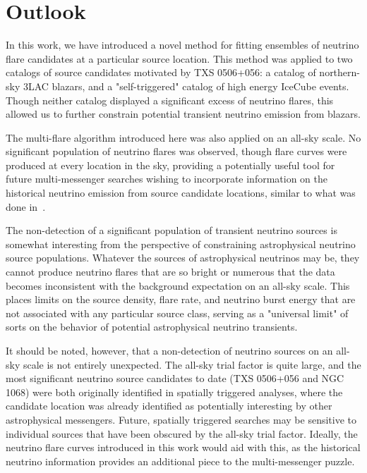 \chapter{Outlook}\label{chapter:outlook}

In this work, we have introduced a novel method for fitting ensembles of neutrino flare candidates at a particular source location. This method was applied to two catalogs of source candidates motivated by TXS 0506+056: a catalog of northern-sky 3LAC blazars, and a "self-triggered" catalog of high energy IceCube events. Though neither catalog displayed a significant excess of neutrino flares, this allowed us to further constrain potential transient neutrino emission from blazars. 

The multi-flare algorithm introduced here was also applied on an all-sky scale. No significant population of neutrino flares was observed, though flare curves were produced at every location in the sky, providing a potentially useful tool for future multi-messenger searches wishing to incorporate information on the historical neutrino emission from source candidate locations, similar to what was done in~\cite{TXS_Archival}. 

The non-detection of a significant population of transient neutrino sources is somewhat interesting from the perspective of constraining astrophysical neutrino source populations. Whatever the sources of astrophysical neutrinos may be, they cannot produce neutrino flares that are so bright or numerous that the data becomes inconsistent with the background expectation on an all-sky scale. This places limits on the source density, flare rate, and neutrino burst energy that are not associated with any particular source class, serving as a "universal limit" of sorts on the behavior of potential astrophysical neutrino transients. 

It should be noted, however, that a non-detection of neutrino sources on an all-sky scale is not entirely unexpected. The all-sky trial factor is quite large, and the most significant neutrino source candidates to date (TXS 0506+056 and NGC 1068) were both originally identified in spatially triggered analyses, where the candidate location was already identified as potentially interesting by other astrophysical messengers. Future, spatially triggered searches may be sensitive to individual sources that have been obscured by the all-sky trial factor. Ideally, the neutrino flare curves introduced in this work would aid with this, as the historical neutrino information provides an additional piece to the multi-messenger puzzle. 

